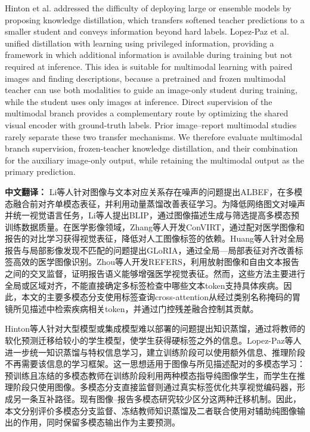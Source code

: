 \documentclass[Afour,sagev,times]{sagej}
\begin{document}
Hinton et al. addressed the difficulty of deploying large or ensemble models by proposing knowledge distillation, which transfers softened teacher predictions to a smaller student and conveys information beyond hard labels.\cite{R24} Lopez-Paz et al. unified distillation with learning using privileged information, providing a framework in which additional information is available during training but not required at inference.\cite{R25} This idea is suitable for multimodal learning with paired images and finding descriptions, because a pretrained and frozen multimodal teacher can use both modalities to guide an image-only student during training, while the student uses only images at inference. Direct supervision of the multimodal branch provides a complementary route by optimizing the shared visual encoder with ground-truth labels. Prior image--report multimodal studies rarely separate these two transfer mechanisms. We therefore evaluate multimodal branch supervision, frozen-teacher knowledge distillation, and their combination for the auxiliary image-only output, while retaining the multimodal output as the primary prediction.

\noindent\textbf{中文翻译：}
Li等人针对图像与文本对应关系存在噪声的问题提出ALBEF，在多模态融合前对齐单模态表征，并利用动量蒸馏改善表征学习。为降低网络图文对噪声并统一视觉语言任务，Li等人提出BLIP，通过图像描述生成与筛选提高多模态预训练数据质量。在医学影像领域，Zhang等人开发ConVIRT，通过配对医学图像和报告的对比学习获得视觉表征，降低对人工图像标签的依赖。Huang等人针对全局报告与局部影像发现不匹配的问题提出GLoRIA，通过全局—局部表征对齐改善标签高效的医学图像识别。Zhou等人开发REFERS，利用放射图像和自由文本报告之间的交叉监督，证明报告语义能够增强医学视觉表征。然而，这些方法主要进行全局或区域对齐，不能直接确定多标签检查中哪些文本token支持具体疾病。因此，本文的主要多模态分支使用标签查询cross-attention从经过类别名称掩码的胃镜所见描述中检索疾病相关token，并通过门控残差融合控制其贡献。

Hinton等人针对大型模型或集成模型难以部署的问题提出知识蒸馏，通过将教师的软化预测迁移给较小的学生模型，使学生获得硬标签之外的信息。Lopez-Paz等人进一步统一知识蒸馏与特权信息学习，建立训练阶段可以使用额外信息、推理阶段不再需要该信息的学习框架。这一思想适用于图像与所见描述配对的多模态学习：预训练且冻结的多模态教师在训练阶段利用两种模态指导纯图像学生，而学生在推理阶段只使用图像。多模态分支直接监督则通过真实标签优化共享视觉编码器，形成另一条互补路径。现有图像--报告多模态研究较少区分这两种迁移机制。因此，本文分别评价多模态分支监督、冻结教师知识蒸馏及二者联合使用对辅助纯图像输出的作用，同时保留多模态输出作为主要预测。
\end{document}
